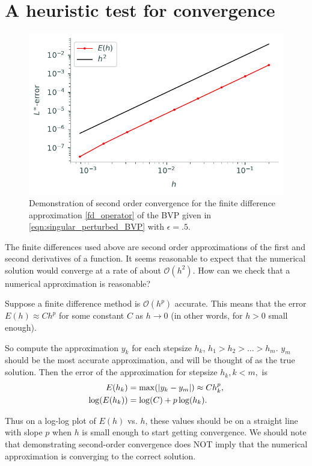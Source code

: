 \section*{A heuristic test for convergence}
\begin{figure}[ht]
\centering
\includegraphics[width=12cm]{figures/example_convergence.pdf}
\caption{Demonstration of second order convergence for the finite difference approximation \eqref{fd_operator} of the BVP given in \eqref{eqn:singular_perturbed_BVP} with $\epsilon = .5$. } \label{fig:finitedifference2}
\end{figure}

The finite differences used above are second order approximations of the first and second derivatives of a function.  It seems reasonable to expect that the numerical solution would converge at a rate of about $\mathcal{O}(h^2)$. How can we check that a numerical approximation is reasonable?

Suppose a finite difference method is $\mathcal{O}(h^p)$ accurate.
This means that the error $E(h) \approx Ch^p$ for some constant $C$ as $h \to 0$ (in other words, for $h>0$ small enough).

So compute the approximation $y_k$ for each stepsize $h_k$, $h_1 > h_2> \ldots>h_m$.
$y_m$ should be the most accurate approximation, and will be thought of as the true solution.
Then the error of the approximation for
stepsize $h_k, k < m,$ is
\begin{align*}
	E(h_k) &= \max( \left\lvert y_k - y_m\right\rvert) \approx C h_k^p ,\\
	\log(E(h_k)) &= \log(C) + p \log(h_k).
\end{align*}

Thus on a log-log plot of $E(h)$ vs. $h$, these values should be on a straight line with slope $p$ when $h$ is small enough to start getting convergence. We should note that demonstrating second-order convergence does NOT imply that the numerical approximation is converging to the correct solution.



